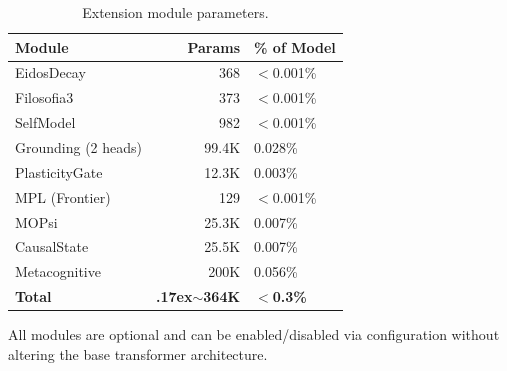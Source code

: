 \begin{table}[H]
\centering
\caption{Extension module parameters.}
\label{tab:overhead}
\begin{tabular}{lrl}
\toprule
\textbf{Module} & \textbf{Params} & \textbf{\% of Model} \\
\midrule
EidosDecay & 368 & $<$0.001\% \\
Filosofia3 & 373 & $<$0.001\% \\
SelfModel & 982 & $<$0.001\% \\
Grounding (2 heads) & 99.4K & 0.028\% \\
PlasticityGate & 12.3K & 0.003\% \\
MPL (Frontier) & 129 & $<$0.001\% \\
MOPsi & 25.3K & 0.007\% \\
CausalState & 25.5K & 0.007\% \\
Metacognitive & 200K & 0.056\% \\
\midrule
\textbf{Total} & \textbf{{\raise.17ex\hbox{$\scriptstyle\sim$}}364K} & \textbf{$<$0.3\%} \\
\bottomrule
\end{tabular}
\end{table}

All modules are optional and can be enabled/disabled via configuration
without altering the base transformer architecture.
